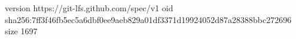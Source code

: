 version https://git-lfs.github.com/spec/v1
oid sha256:7ff3f46fb5ec5a6dbf0ee9aeb829a01df3371d19924052d87a28388bbc272696
size 1697
